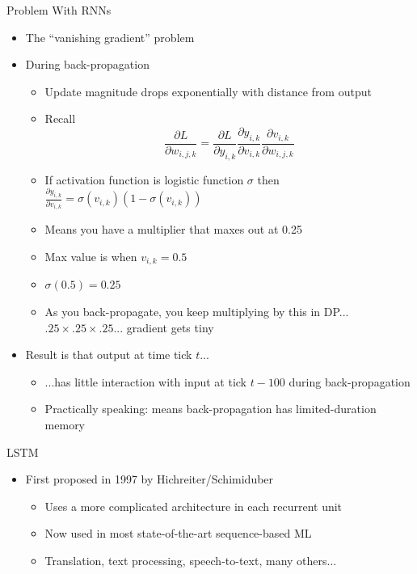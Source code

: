 \documentclass[aspectratio=169]{beamer}
\begin{document}
\begin{frame}{Problem With RNNs}

\begin{itemize}
	\item The ``vanishing gradient'' problem
	\item During back-propagation
	\begin{itemize}
	\item Update magnitude drops exponentially with distance from output
	\item Recall 
        $$ \frac{\partial L}{\partial w_{i,j,k}} = \frac{\partial L}{\partial y_{i,k}}
                                                \frac{\partial y_{i,k}}{\partial v_{i,k}}
                                                \frac{\partial v_{i,k}}{\partial w_{i,j,k}}$$
	\item If activation function is logistic function $\sigma$ then
	$\frac{\partial y_{i,k}}{\partial v_{i,k}} = \sigma (v_{i,k})(1 - \sigma (v_{i,k}))$
	\item Means you have a multiplier that maxes out at 0.25
	\item Max value is when $v_{i,k} = 0.5$
	\item $\sigma(0.5) = 0.25$
	\item As you back-propagate, you keep multiplying by this in DP... $.25 \times .25 \times .25 ...$ gradient gets tiny
	\end{itemize}
	\item Result is that output at time tick $t$...
	\begin{itemize}
	\item ...has little interaction with input at tick $t - 100$ during back-propagation
	\item Practically speaking: means back-propagation has limited-duration memory
	\end{itemize}
\end{itemize}
\end{frame}
\begin{frame}{LSTM}

\begin{itemize}
	\item First proposed in 1997 by Hichreiter/Schimiduber
	\begin{itemize}
	\item Uses a more complicated architecture in each recurrent unit
	\item Now used in most state-of-the-art sequence-based ML
	\item Translation, text processing, speech-to-text, many others...
	\end{itemize}
\end{itemize}
\end{frame}
\end{document}
